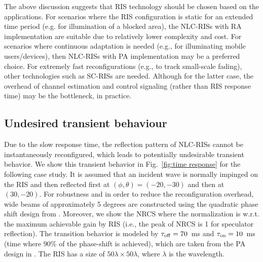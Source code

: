 
The above discussion suggests that \gls{RIS} technology should be chosen based on the applications. For scenarios where the \gls{RIS} configuration is static for an extended time period (e.g. for illumination of a blocked area), the \gls{NLC}-\glspl{RIS} with \gls{RA} implementation are suitable due to relatively lower complexity and cost. For scenarios where continuous adaptation is needed (e.g., for illuminating mobile users/devices), then \gls{NLC}-\glspl{RIS} with \gls{PA} implementation may be a preferred choice. For extremely fast reconfigurations (e.g., to track small-scale fading), other technologies such as \gls{SC}-\glspl{RIS} are needed. Although for the latter case, the overhead of channel estimation and control signaling (rather than \gls{RIS} response time) may be the bottleneck, in practice. 



\subsection{Undesired transient behaviour}

Due to the slow response time, the reflection pattern of \gls{NLC}-\glspl{RIS} cannot be instantaneously reconfigured, which leads to potentially undesirable transient behavior. We show this transient behavior in Fig.~\ref{fig:time response} for the following case study. It is assumed that an incident wave is normally impinged on the \gls{RIS} and then reflected first at $(\phi,\theta)=(-20,-30)$ and then at $(30,-20)$. For robustness and in order to reduce the reconfiguration overhead, wide beams of approximately 5 degrees are constructed using the quadratic phase shift design from \cite{jamali2021power}. Moreover, we show the \gls{NRCS} where the normalization is w.r.t. the maximum achievable gain by \gls{RIS} (i.e., the peak of \gls{NRCS} is 1 for speculator reflection). The transition behavior is modeled by $\tau_{\rm off}=70$~ms and $\tau_{\rm on}=10$~ms (time where $90\%$ of the phase-shift is achieved), which are taken from the \gls{PA} design in \cite{neuder2023compact}. The \gls{RIS} has a size of $50\lambda\times 50\lambda$, where $\lambda$ is the wavelength. 

